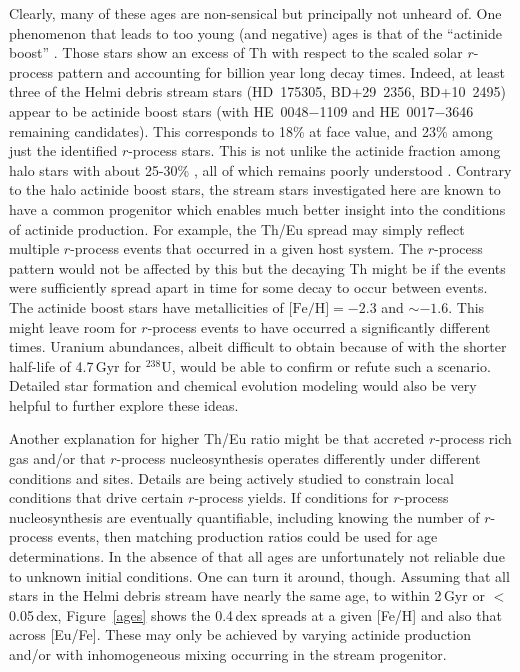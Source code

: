 \documentclass[twocolumn]{aastex63}
\begin{document}
  
Clearly, many of these ages are non-sensical but principally not unheard of. One phenomenon that leads to too young (and negative) ages is that of the ``actinide boost'' \citep{Schatz02}. Those stars show an excess of Th with respect to the scaled solar $r$-process pattern and accounting for billion year long decay times. Indeed, at least three of the Helmi debris stream stars (HD~175305, \mbox{BD+29 2356}, \mbox{BD+10 2495}) 
appear to be actinide boost stars (with HE~0048$-$1109 and HE~0017$-$3646 remaining candidates).
This corresponds to 18\% at face value, and 23\% among just the identified $r$-process stars. This is not unlike the actinide fraction among halo stars with about 25-30\% \citep{mashonkina2014}, all of which remains poorly understood \citep{holmbeck2019}. 
Contrary to the halo actinide boost stars, the stream stars investigated here are known to have a common progenitor which enables much better insight into the conditions of actinide production. For example, the Th/Eu spread may simply reflect multiple $r$-process events that occurred in a given host system. The $r$-process pattern would not be affected by this but the decaying Th might be if the events were sufficiently spread apart in time for some decay to occur between events. The actinide boost stars have metallicities of $\mbox{[Fe/H]} =-2.3$ and $\sim-1.6$. This might leave room for $r$-process events to have occurred a significantly different times.
Uranium abundances, albeit difficult to obtain because of with the shorter half-life of 4.7\,Gyr for $^{238}$U, would be able to confirm or refute such a scenario. Detailed star formation and chemical evolution modeling would also be very helpful to further explore these ideas. 

Another explanation for higher Th/Eu ratio might be that accreted $r$-process rich gas and/or that $r$-process nucleosynthesis operates differently under different conditions and sites. Details are being actively studied \citep{holmbeck19} to constrain local conditions that drive certain $r$-process yields. If conditions for $r$-process nucleosynthesis are eventually quantifiable, including knowing the number of $r$-process events, then matching production ratios could be used for age determinations. In the absence of that all ages are unfortunately not reliable due to unknown initial conditions. One can turn it around, though. Assuming that all stars in the Helmi debris stream have nearly the same age, to within 2\,Gyr or $<$0.05\,dex, Figure~\ref{ages} shows the 0.4\,dex spreads at a given [Fe/H] and also that across [Eu/Fe]. These  may only be achieved by varying actinide production and/or with inhomogeneous mixing occurring in the stream progenitor.
\end{document}
